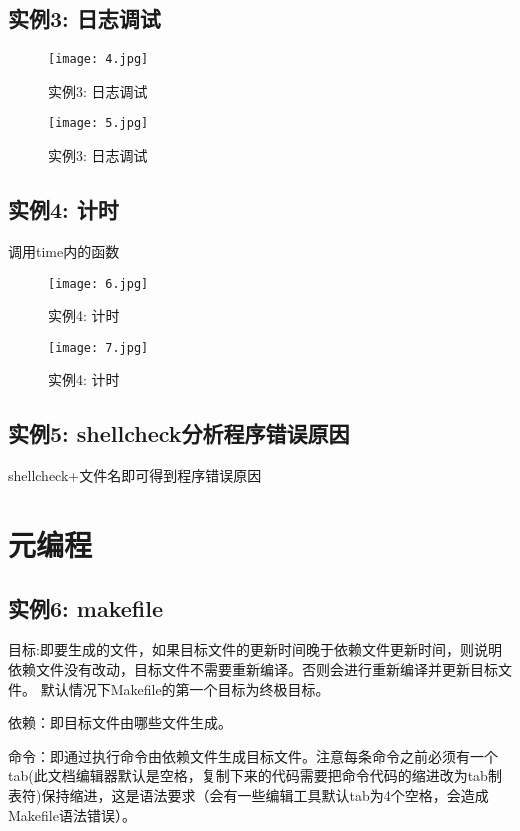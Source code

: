 \documentclass[a4paper, 12pt]{article}
\begin{document}
          \subsection{实例3: 日志调试}
          \begin{figure}[h!]
            \centering
            \texttt{[image: 4.jpg]}
            \caption{实例3: 日志调试 }
          \end{figure}
          \begin{figure}[h!]
            \centering
            \texttt{[image: 5.jpg]}
            \caption{实例3: 日志调试 }
          \end{figure}
          
          \subsection{实例4: 计时}
          调用time内的函数
          \begin{figure}[h!]
            \centering
            \texttt{[image: 6.jpg]}
            \caption{实例4: 计时 }
          \end{figure}
          \begin{figure}[h!]
            \centering
            \texttt{[image: 7.jpg]}
            \caption{实例4: 计时 }
          \end{figure}
          \subsection{实例5: shellcheck分析程序错误原因}
          shellcheck+文件名即可得到程序错误原因
          \section{元编程}
          \subsection{实例6: makefile}
          目标:即要生成的文件，如果目标文件的更新时间晚于依赖文件更新时间，则说明依赖文件没有改动，目标文件不需要重新编译。否则会进行重新编译并更新目标文件。
          默认情况下Makefile的第一个目标为终极目标。\par
          依赖：即目标文件由哪些文件生成。\par
          命令：即通过执行命令由依赖文件生成目标文件。注意每条命令之前必须有一个tab(此文档编辑器默认是空格，复制下来的代码需要把命令代码的缩进改为tab制表符)保持缩进，这是语法要求（会有一些编辑工具默认tab为4个空格，会造成Makefile语法错误）。
\end{document}
